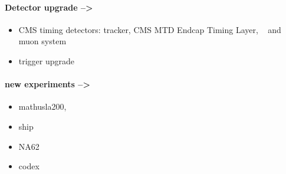 \paragraph{Detector upgrade -->}
\begin{itemize}
\item CMS timing detectors: tracker,  CMS MTD Endcap Timing Layer,
  ~\cite{CERN-LHCC-2017-027} and muon system 
\item trigger upgrade
\end{itemize}

\paragraph{new experiments -->}
\begin{itemize}
\item mathusla200,
\item ship
\item NA62
\item codex
\end{itemize}






\vspace {5cm}













